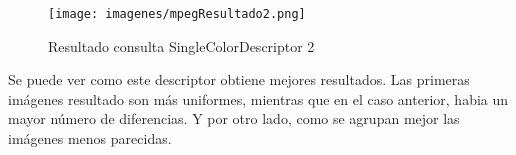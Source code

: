 \begin{figure}[H] %
\centering
\texttt{[image: imagenes/mpegResultado2.png]}  %
\label{mpegResultado1.png}
\caption{Resultado consulta SingleColorDescriptor 2 }
\end{figure}

Se puede ver como este descriptor obtiene mejores resultados. Las primeras imágenes resultado son más uniformes, mientras que en el caso anterior, habia un mayor número de diferencias. Y por otro lado, como se agrupan mejor las imágenes menos parecidas.





